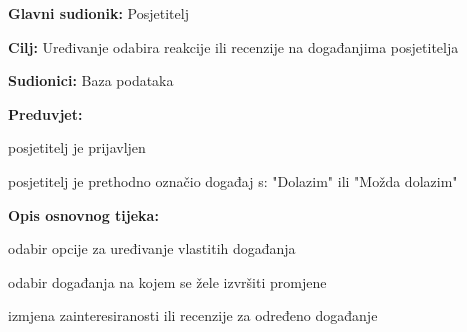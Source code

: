 					\noindent {}
					\begin{packed_item}
	
						\item \textbf{Glavni sudionik: }Posjetitelj
						\item  \textbf{Cilj:} Uređivanje odabira reakcije ili recenzije na događanjima posjetitelja
						\item  \textbf{Sudionici:} Baza podataka
						\item  \textbf{Preduvjet:}
						\item[] \begin{packed_item}
								
								\item  posjetitelj je prijavljen
								\item  posjetitelj je prethodno označio događaj s: "Dolazim" ili "Možda dolazim" 
								
								
							\end{packed_item} 
						\item  \textbf{Opis osnovnog tijeka:}
						
						\item[] \begin{packed_enum}
	
							\item odabir opcije za uređivanje vlastitih događanja
							\item odabir događanja na kojem se žele izvršiti promjene
							\item izmjena zainteresiranosti ili recenzije za određeno događanje 
							
						\end{packed_enum}
						
					\end{packed_item}
					
